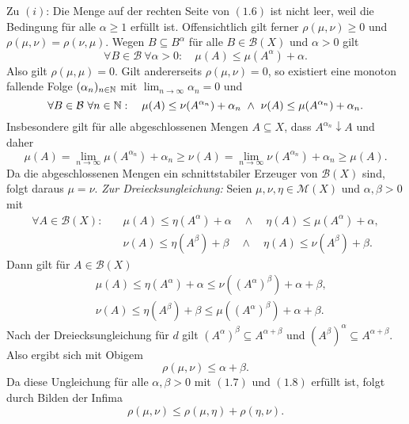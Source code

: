 \begin{proof*}
    Zu $(i)$: Die Menge auf der rechten Seite von $(1.6)$ ist nicht leer, weil die Bedingung für alle $\alpha \geq 1$ erfüllt ist. Offensichtlich gilt ferner $\rho(\mu, \nu) \geq 0$ und $\rho(\mu, \nu) = \rho(\nu, \mu)$. 
    Wegen $B \subseteq B^{\alpha}$ für alle $B \in \mathcal{B}(X)$ und $\alpha > 0$ gilt 
    $$
        \forall B \in \mathcal{B} \ \forall \alpha > 0: \quad \mu(A) \leq \mu(A^{\alpha}) + \alpha.
    $$
    Also gilt $\rho(\mu, \mu) = 0$. Gilt andererseits $\rho(\mu, \nu) = 0$, so existiert eine monoton fallende Folge $(\alpha_n)_{n \in \mathbb{N}}$ mit $\lim_{n \to \infty}\alpha_n = 0$ und
    $$
    \forall B \in \mathcal{B} \ \forall n \in \mathbb{N}: \quad \mu(A) \leq \nu(A^{\alpha_n}) + \alpha_n \ \land \ \nu(A) \leq \mu(A^{\alpha_n}) + \alpha_n.
    $$
    Insbesondere gilt für alle abgeschlossenen Mengen $A \subseteq X$, dass $A^{\alpha_n} \downarrow A$ und daher
    $$
        \mu(A) = \lim_{n \to \infty} \mu(A^{\alpha_n}) + \alpha_n \geq \nu(A) = \lim_{n \to \infty} \nu(A^{\alpha_n}) + \alpha_n \geq \mu(A). 
    $$
    Da die abgeschlossenen Mengen ein schnittstabiler Erzeuger von $\mathcal{B}(X)$ sind, folgt daraus $\mu = \nu$.
    \newline
    \textit{Zur Dreiecksungleichung:} Seien $\mu, \nu, \eta \in \mathcal{M}(X)$ und $\alpha, \beta > 0$ mit 
    \begin{align}
        \forall A \in \mathcal{B}(X): \quad &\mu(A) \leq \eta(A^{\alpha}) + \alpha \quad \land \quad \eta(A) \leq \mu(A^{\alpha}) + \alpha, \\\
                                            &\nu(A) \leq \eta(A^{\beta}) + \beta \quad \land \quad \eta(A) \leq \nu(A^{\beta}) + \beta.
    \end{align}
    Dann gilt für $A \in \mathcal{B}(X)$
    \begin{align*}
        &\mu(A) \leq \eta(A^{\alpha}) + \alpha \leq \nu((A^{\alpha})^{\beta}) + \alpha + \beta, \\\
        &\nu(A) \leq \eta(A^{\beta}) + \beta \leq \mu((A^{\alpha})^{\beta}) + \alpha + \beta. 
    \end{align*}
    Nach der Dreiecksungleichung für $d$ gilt $(A^{\alpha})^{\beta} \subseteq A^{\alpha + \beta}$ und $(A^{\beta})^{\alpha} \subseteq A^{\alpha + \beta}$. Also ergibt sich mit Obigem 
    $$
    \rho(\mu, \nu) \leq \alpha + \beta.
    $$ 
    Da diese Ungleichung für alle $\alpha, \beta > 0$ mit $(1.7)$ und $(1.8)$ erfüllt ist, folgt durch Bilden der Infima 
    $$
        \rho(\mu, \nu) \leq \rho(\mu, \eta) + \rho(\eta, \nu).
$$
\end{proof*}
